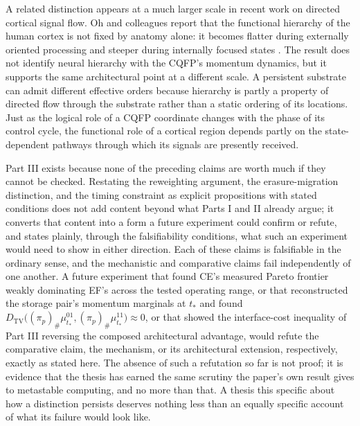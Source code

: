 \documentclass[11pt]{article}
\begin{document}
A related distinction appears at a much larger scale in recent work on directed cortical signal flow. Oh and colleagues report that the functional hierarchy of the human cortex is not fixed by anatomy alone: it becomes flatter during externally oriented processing and steeper during internally focused states \cite{OhEtAl2026}. The result does not identify neural hierarchy with the CQFP's momentum dynamics, but it supports the same architectural point at a different scale. A persistent substrate can admit different effective orders because hierarchy is partly a property of directed flow through the substrate rather than a static ordering of its locations. Just as the logical role of a CQFP coordinate changes with the phase of its control cycle, the functional role of a cortical region depends partly on the state-dependent pathways through which its signals are presently received.

Part III exists because none of the preceding claims are worth much if they cannot be checked. Restating the reweighting argument, the erasure-migration distinction, and the timing constraint as explicit propositions with stated conditions does not add content beyond what Parts I and II already argue; it converts that content into a form a future experiment could confirm or refute, and states plainly, through the falsifiability conditions, what such an experiment would need to show in either direction. Each of these claims is falsifiable in the ordinary sense, and the mechanistic and comparative claims fail independently of one another. A future experiment that found CE's measured Pareto frontier weakly dominating EF's across the tested operating range, or that reconstructed the storage pair's momentum marginals at $t_\ast$ and found $D_{\mathrm{TV}}\bigl((\pi_p)_\#\mu_{t_\ast}^{01},(\pi_p)_\#\mu_{t_\ast}^{11}\bigr)\approx0$, or that showed the interface-cost inequality of Part III reversing the composed architectural advantage, would refute the comparative claim, the mechanism, or its architectural extension, respectively, exactly as stated here. The absence of such a refutation so far is not proof; it is evidence that the thesis has earned the same scrutiny the paper's own result gives to metastable computing, and no more than that. A thesis this specific about how a distinction persists deserves nothing less than an equally specific account of what its failure would look like.
\end{document}
